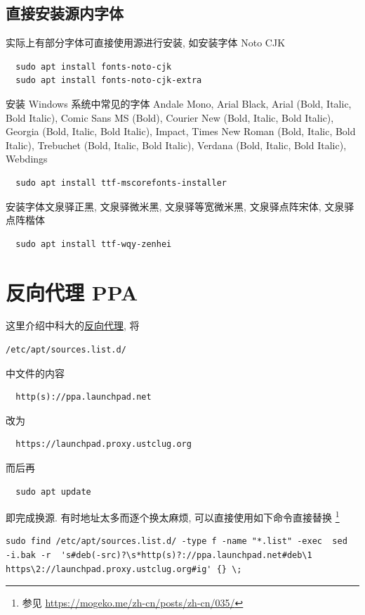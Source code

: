 \subsection{直接安装源内字体}\label{chap:appendix:subsec:font}

实际上有部分字体可直接使用源进行安装,
如安装字体 Noto CJK
\begin{lstlisting}
  sudo apt install fonts-noto-cjk
  sudo apt install fonts-noto-cjk-extra
\end{lstlisting}
安装 Windows 系统中常见的字体 Andale Mono,
Arial Black,
Arial (Bold, Italic, Bold Italic),
Comic Sans MS (Bold),
Courier New (Bold, Italic, Bold Italic),
Georgia (Bold, Italic, Bold Italic),
Impact,
Times New Roman (Bold, Italic, Bold Italic),
Trebuchet (Bold, Italic, Bold Italic),
Verdana (Bold, Italic, Bold Italic),
Webdings
\begin{lstlisting}
  sudo apt install ttf-mscorefonts-installer
\end{lstlisting}
安装字体文泉驿正黑,
文泉驿微米黑,
文泉驿等宽微米黑,
文泉驿点阵宋体,
文泉驿点阵楷体
\begin{lstlisting}
  sudo apt install ttf-wqy-zenhei
\end{lstlisting}

\section{反向代理 PPA}\label{sec:addition:proxy}

这里介绍中科大的\href{https://mirrors.ustc.edu.cn/}{反向代理},
将
\begin{lstlisting}[deletekeywords = apt]
  /etc/apt/sources.list.d/
\end{lstlisting}
中文件的内容
\begin{lstlisting}
  http(s)://ppa.launchpad.net
\end{lstlisting}
改为
\begin{lstlisting}
  https://launchpad.proxy.ustclug.org
\end{lstlisting}
而后再
\begin{lstlisting}
  sudo apt update
\end{lstlisting}
即完成换源.
有时地址太多而逐个换太麻烦,
可以直接使用如下命令直接替换%
\footnote{参见 \url{https://mogeko.me/zh-cn/posts/zh-cn/035/}}
\begin{lstlisting}[deletekeywords = apt]
  sudo find /etc/apt/sources.list.d/ -type f -name "*.list" -exec  sed  -i.bak -r  's#deb(-src)?\s*http(s)?://ppa.launchpad.net#deb\1 https\2://launchpad.proxy.ustclug.org#ig' {} \;
\end{lstlisting}

